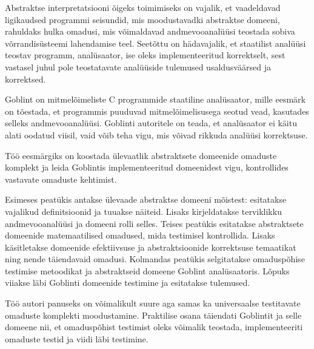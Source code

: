 \documentclass[../thesis.tex]{subfiles}
\begin{document}
Abstraktse interpretatsiooni õigeks toimimiseks on vajalik, et vaadeldavad ligikaudsed programmi seisundid, mis moodustavadki abstraktse domeeni, rahuldaks hulka omadusi, mis võimaldavad andmevooanalüüsi teostada sobiva võrrandisüsteemi lahendamise teel. Seetõttu on hädavajalik, et staatilist analüüsi teostav programm, analüsaator, ise oleks implementeeritud korrektselt, sest vastasel juhul pole teostatavate analüüside tulemused usaldusväärsed ja korrektsed.

Goblint on mitmelõimeliste C programmide staatiline analüsaator, mille eesmärk on tõestada, et programmis puuduvad mitmelõimelisusega seotud vead, kasutades selleks andmevooanalüüsi. Goblinti autoritele on teada, et analüsaator ei käitu alati oodatud viisil, vaid võib teha vigu, mis võivad rikkuda analüüsi korrektsuse.

\begin{comment}
Omaduspõhine testimine on testimismeetod, mis on sobib hästi programmi loogika matemaatiliste omaduse kontrollimiseks. Selleks kirjeldatakse kontrollitavad omadused predikaatidena ja neile juhuslike argumentide genereerimise metoodika. Nende kombineerimisel genereeritakse soovitud kogus juhuslike argumentide komplekte, millel leitakse predikaatide väärtused, kinnitades omaduse kehtimist või kummutades selle. Lisaks toetab omaduspõhise testimise raamistik leitud vääravate testjuhtude lihtsustamist.

\TODO{Siduda analüsaatori korrektsus omaduspõhise testimise kasutamisega}
\end{comment}

Töö eesmärgiks on koostada ülevaatlik abstraktsete domeenide omaduste komplekt ja leida Goblintis implementeeritud domeenidest vigu, kontrollides vastavate omaduste kehtimist.

Esimeses peatükis antakse ülevaade abstraktse domeeni mõistest: esitatakse vajalikud definitsioonid ja tuuakse näiteid. Lisaks kirjeldatakse terviklikku andmevooanalüüsi ja domeeni rolli selles.
Teises peatükis esitatakse abstraktsete domeenide matemaatilised omadused, mida testimisel kontrollida. Lisaks käsitletakse domeenide efektiivsuse ja abstraktsioonide korrektsuse temaatikat ning nende täiendavaid omadusi.
Kolmandas peatükis selgitatakse omaduspõhise testimise metoodikat ja abstraktseid domeene Goblint analüsaatoris. Lõpuks viiakse läbi Goblinti domeenide testimine ja esitatakse tulemused.

Töö autori panuseks on võimalikult suure aga samas ka universaalse testitavate omaduste komplekti moodustamine. Praktilise osana täiendati Goblintit ja selle domeene nii, et omaduspõhist testimist oleks võimalik teostada, implementeeriti omaduste testid ja viidi läbi testimine.
\end{document}
